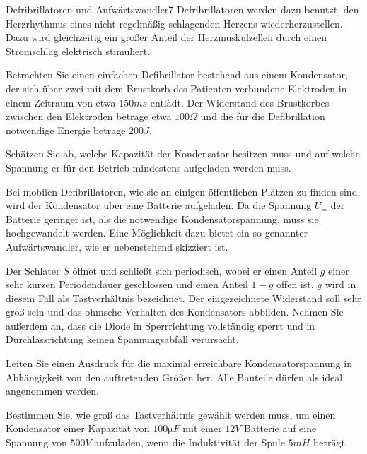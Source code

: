 \begin{problem}{Defribrillatoren und Aufwärtswandler}{7}
 Defribrillatoren werden dazu benutzt, den Herzrhythmus eines nicht regelmäßig schlagenden Herzens wiederherzustellen.  Dazu wird gleichzeitig ein großer Anteil der Herzmuskulzellen durch einen Stromschlag elektrisch stimuliert.

Betrachten Sie einen einfachen Defibrillator bestehend aus einem Kondensator, der sich über zwei mit dem Brustkorb des Patienten verbundene Elektroden in einem Zeitraum von etwa $150\unit{ms}$ entlädt.  Der Widerstand des Brustkorbes zwischen den Elektroden betrage etwa $100\unit{\Omega}$ und die für die Defibrillation notwendige Energie betrage $200\unit{J}$.

\begin{abcenum}
\item Schätzen Sie ab, welche Kapazität der Kondensator besitzen muss und auf welche Spannung er für den Betrieb mindestens aufgeladen werden muss.
\end{abcenum}

Bei mobilen Defibrillatoren, wie sie an einigen öffentlichen Plätzen zu finden sind, wird der Kondensator über eine Batterie aufgeladen.  Da die Spannung $U_=$ der Batterie geringer ist, als die notwendige Kondensatorspannung, muss sie hochgewandelt werden.  Eine Möglichkeit dazu bietet ein so genannter Aufwärtswandler, wie er nebenstehend skizziert ist.

Der Schlater $S$ öffnet und schließt sich periodisch, wobei er einen Anteil $g$ einer sehr kurzen Periodendauer geschlossen und einen Anteil $1-g$ offen ist.  $g$ wird in diesem Fall als Tastverhältnis bezeichnet.  Der eingezeichnete Widerstand soll sehr groß sein und das ohmsche Verhalten des Kondensators abbilden.  Nehmen Sie außerdem an, dass die Diode in Sperrrichtung vollständig sperrt und in Durchlassrichtung keinen Spannungsabfall verursacht.

\begin{abcenum}
  \item Leiten Sie einen Ausdruck für die maximal erreichbare Kondensatorspannung in Abhängigkeit von den auftretenden Größen her.  Alle Bauteile dürfen als ideal angenommen werden.
\item Bestimmen Sie, wie groß das Tastverhältnis gewählt werden muss, um einen Kondensator einer Kapazität von $100\unit{\micro F}$ mit einer $12\unit{V}$ Batterie auf eine Spannung von $500\unit{V}$ aufzuladen, wenn die Induktivität der Spule $5\unit{mH}$ beträgt.
\end{abcenum}

\end{problem}

